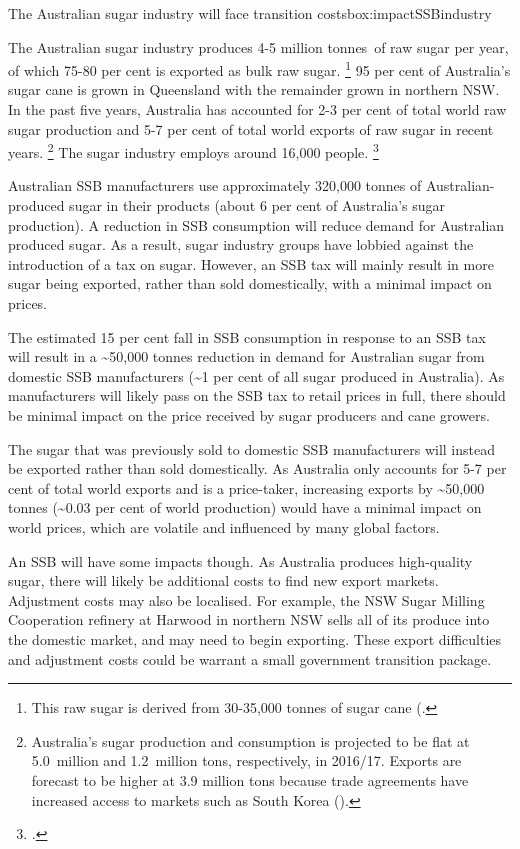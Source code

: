 \documentclass[embargoed]{grattan}
\begin{document}
\begin{bigbox*}{The Australian sugar industry will face transition costs}{box:impactSSBindustry}

The Australian sugar industry produces 4-5 million tonnes~of raw sugar per year, of which 75-80 per cent is exported as bulk raw sugar.%
\footnote{This raw sugar is derived from 30-35,000 tonnes of sugar cane (\textcites{Canegrowers2015Statisticsfacts}{Agriculture2016SugarWorldMarkets}{Council2016Sugarcanestatistics}.} 95 per cent of Australia's sugar cane is grown in Queensland with the remainder grown in northern NSW.
In the past five years, Australia has accounted for 2-3 per cent of total world raw sugar production and 5-7 per cent of total world exports of raw sugar in recent years.%
\footnote{Australia's sugar production and consumption is projected to be flat at 5.0~million and 1.2~million tons, respectively, in 2016/17.
Exports are forecast to be higher at 3.9 million tons because trade agreements have increased access to markets such as South Korea (\textcite{Agriculture2016SugarWorldMarkets}).} The sugar industry employs around 16,000 people.%
\footcite{Council2016Sugarcanestatistics}

Australian SSB manufacturers use approximately 320,000 tonnes of Australian-produced sugar in their products (about 6 per cent of Australia's sugar production).
A reduction in SSB consumption will reduce demand for Australian produced sugar.
As a result, sugar industry groups have lobbied against the introduction of a tax on sugar.
However, an SSB tax will mainly result in more sugar being exported, rather than sold domestically, with a minimal impact on prices.

The estimated 15 per cent fall in SSB consumption in response to an SSB tax will result in a \textasciitilde{}50,000 tonnes reduction in demand for Australian sugar from domestic SSB manufacturers (\textasciitilde{}1 per cent of all sugar produced in Australia).
As manufacturers will likely pass on the SSB tax to retail prices in full, there should be minimal impact on the price received by sugar producers and cane growers.

The sugar that was previously sold to domestic SSB manufacturers will instead be exported rather than sold domestically.
As Australia only accounts for 5-7 per cent of total world exports and is a price-taker, increasing exports by \textasciitilde{}50,000 tonnes (\textasciitilde{}0.03 per cent of world production) would have a minimal impact on world prices, which are volatile and influenced by many global factors. 

An SSB will have some impacts though.
As Australia produces high-quality sugar, there will likely be additional costs to find new export markets.
Adjustment costs may also be localised.
For example, the NSW Sugar Milling Cooperation refinery at Harwood in northern NSW sells all of its produce into the domestic market, and may need to begin exporting.
These export difficulties and adjustment costs could be warrant a small government transition package.
\end{bigbox*}
\end{document}
